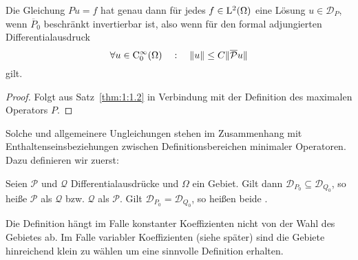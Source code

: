 \begin{thm}
Die Gleichung $Pu=f$ hat genau dann für jedes $f\in\mathrm L^2(\Omega)$ eine L\"osung $u\in\mathcal D_{P}$, wenn $\overline P_0$ beschränkt invertierbar ist, also wenn f\"ur den formal adjungierten Differentialausdruck
\begin{equation}
  \forall u\in\mathrm C^\infty_0(\Omega)\quad:\quad   \|u\| \le C \| \overline{\mathcal P} u \|
\end{equation}
gilt.
\end{thm}
\begin{proof}
Folgt aus Satz~\ref{thm:1:1.2} in Verbindung mit der Definition des maximalen Operators $P$.
\end{proof}

Solche und allgemeinere Ungleichungen stehen im Zusammenhang mit Enthaltenseinsbeziehungen zwischen Definitionsbereichen minimaler Operatoren. Dazu definieren wir zuerst: 
\begin{df}\label{df:1:1.2}
Seien $\mathcal P$ und $\mathcal Q$ Differentialausdrücke und $\Omega$ ein Gebiet. Gilt dann $\mathcal D_{P_0}\subseteq \mathcal D_{Q_0}$, so heiße $\mathcal P$  als $\mathcal Q$ bzw. $\mathcal Q$  als $\mathcal P$. Gilt $\mathcal D_{P_0}=\mathcal D_{Q_0}$, so heißen beide .
\end{df}
Die  Definition hängt im Falle konstanter Koeffizienten nicht von der Wahl des Gebietes ab. Im Falle variabler Koeffizienten (siehe später) sind die Gebiete hinreichend klein zu wählen um eine sinnvolle Definition erhalten.

